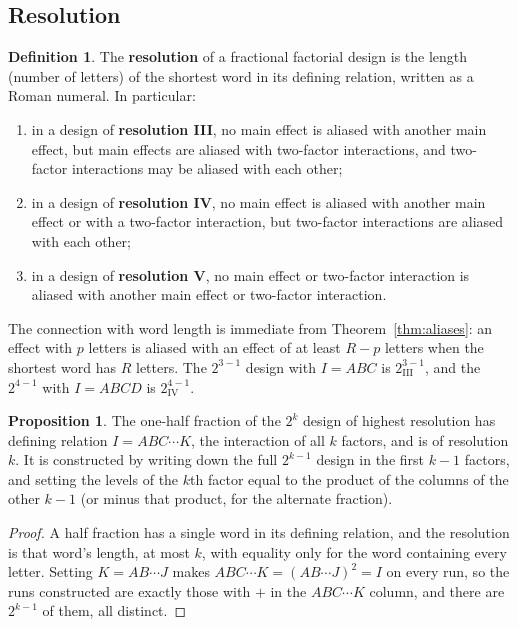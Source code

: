 \documentclass[11pt,a4paper]{article}
\numberwithin{equation}{section}
\theoremstyle{definition}
\newtheorem{defn}[thm]{Definition}
\newtheorem{prop}[thm]{Proposition}
\begin{document}
\subsection{Resolution}
\begin{defn}
The \textbf{resolution} of a fractional factorial design is the length (number of letters) of the shortest word in its defining relation, written as a
Roman numeral. In particular:
\begin{enumerate}[label=(\roman*)]
\item in a design of \textbf{resolution III}, no main effect is aliased with another main effect, but main effects are aliased with two-factor
interactions, and two-factor interactions may be aliased with each other;
\item in a design of \textbf{resolution IV}, no main effect is aliased with another main effect or with a two-factor interaction, but two-factor
interactions are aliased with each other;
\item in a design of \textbf{resolution V}, no main effect or two-factor interaction is aliased with another main effect or two-factor interaction.
\end{enumerate}
\end{defn}

The connection with word length is immediate from Theorem~\ref{thm:aliases}: an effect with $p$ letters is aliased with an effect of at least $R - p$ letters
when the shortest word has $R$ letters. The $2^{3-1}$ design with $I = ABC$ is $2^{3-1}_{\mathrm{III}}$, and the $2^{4-1}$ with $I = ABCD$ is $2^{4-1}_{\mathrm{IV}}$.

\begin{prop}\label{prop:best-half}
The one-half fraction of the $2^k$ design of highest resolution has defining relation $I = ABC\cdots K$, the interaction of all $k$ factors, and is of
resolution $k$. It is constructed by writing down the full $2^{k-1}$ design in the first $k - 1$ factors, and setting the levels of the $k$th factor equal to the
product of the columns of the other $k - 1$ (or minus that product, for the alternate fraction).
\end{prop}

\begin{proof}
A half fraction has a single word in its defining relation, and the resolution is that word's length, at most $k$, with equality only for the word
containing every letter. Setting $K = AB\cdots J$ makes $ABC\cdots K = (AB\cdots J)^2 = I$ on every run, so the runs constructed are exactly those with $+$ in the
$ABC\cdots K$ column, and there are $2^{k-1}$ of them, all distinct.
\end{proof}
\end{document}
